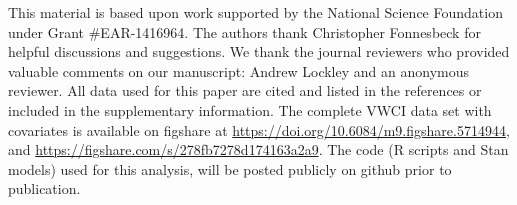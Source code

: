 \documentclass[draft,linenumbers]{agujournal}\usepackage{knitr}
\begin{document}
\acknowledgments
\sloppy
This material is based upon work supported by the National Science Foundation
under Grant \#EAR-1416964.
The authors thank Christopher Fonnesbeck for helpful discussions and suggestions.
We thank the journal reviewers who provided valuable comments on our manuscript:
Andrew Lockley and an anonymous reviewer.
All data used for this paper are cited and listed in the references or
included in the supplementary information.
The complete VWCI data set with
covariates is available on figshare at \url{https://doi.org/10.6084/m9.figshare.5714944},
and \url{https://figshare.com/s/278fb7278d174163a2a9}.
The code (R scripts and Stan models) used for this analysis, will be
posted publicly on github prior to publication.
%
%
\end{document}
